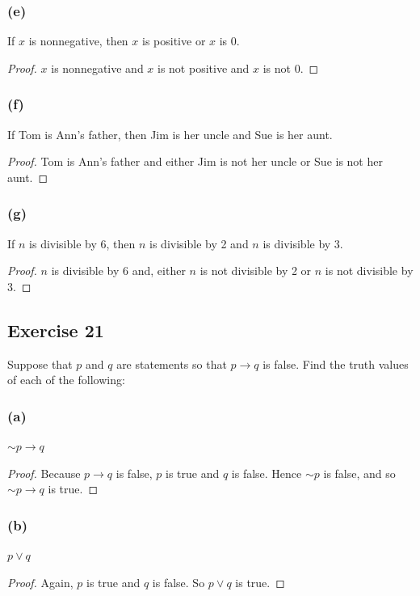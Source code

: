 \documentclass[14pt]{extarticle}
\begin{document}
\subsubsection{(e)} If $x$ is nonnegative, then $x$ is positive or $x$ is 0.
\begin{proof} $x$ is nonnegative and $x$ is not positive and $x$ is not 0.
\end{proof}

\subsubsection{(f)} If Tom is Ann’s father, then Jim is her uncle and Sue is her
aunt.

\begin{proof} Tom is Ann’s father and either Jim is not her uncle or Sue is not
her aunt. \end{proof}

\subsubsection{(g)} If $n$ is divisible by 6, then $n$ is divisible by 2 and $n$
is divisible by 3.

\begin{proof} $n$ is divisible by 6 and, either $n$ is not divisible by 2 or $n$
is not divisible by 3. \end{proof}

\subsection{Exercise 21} Suppose that $p$ and $q$ are statements so that $p \to
q$ is false. Find the truth values of each of the following:

\subsubsection{(a)} ${\sim p} \to q$
\begin{proof} Because $p \to q$ is false, $p$ is true and $q$ is false. Hence
${\sim p}$ is false, and so ${\sim p} \to q$ is true. \end{proof}

\subsubsection{(b)} $p \vee q$
\begin{proof} Again, $p$ is true and $q$ is false. So $p \vee q$ is true.
\end{proof}
\end{document}
